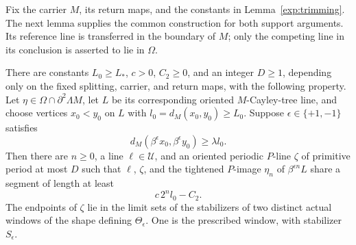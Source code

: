 Fix the carrier $M$, its return maps, and the constants in
Lemma~\ref{exp:trimming}. The next lemma supplies the common construction
for both support arguments. Its reference line is transferred in the
boundary of $M$; only the competing line in its conclusion is asserted
to lie in $\Omega$.

\begin{lemma}
\label{exp:finite-failure}
There are constants $L_0\ge L_*$, $c>0$, $C_2\ge0$, and an integer
$D\ge1$, depending only on the fixed splitting, carrier, and return maps, with
the following property. Let $\eta\in\Omega\cap\partial^2\Lambda M$,
let $L$ be its corresponding oriented $M$-Cayley-tree line, and choose
vertices $x_0<y_0$ on $L$ with $l_0=d_M(x_0,y_0)\ge L_0$. Suppose
$\epsilon\in\{+1,-1\}$ satisfies
\[
 d_M(\beta^\epsilon x_0,\beta^\epsilon y_0)\ge\lambda l_0.
\]
Then there are $n\ge0$, a line $\ell\in\mathcal U$, and an oriented
periodic $P$-line $\zeta$ of primitive period at most $D$ such that
$\ell$, $\zeta$, and the tightened $P$-image $\eta_n$ of
$\beta^{\epsilon n}L$ share a segment of length at least
\begin{equation}
 c\,2^n l_0-C_2.
 \label{exp:failure-overlap}
\end{equation}
The endpoints of $\zeta$ lie in the limit sets of the stabilizers of
two distinct actual windows of the shape defining $\Theta_\epsilon$.
One is the prescribed window, with stabilizer $S_\epsilon$.
\end{lemma}

